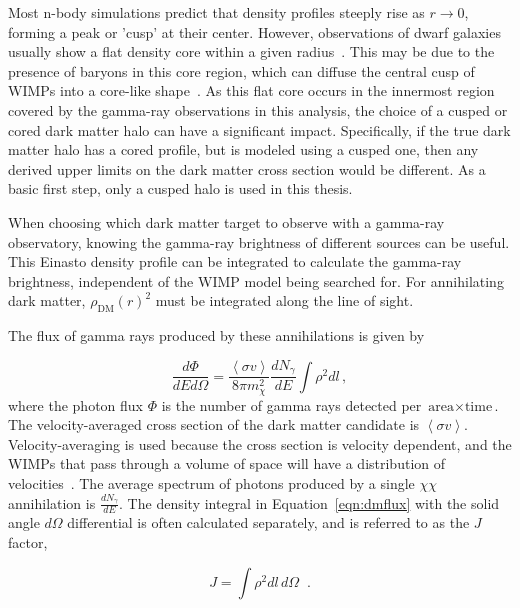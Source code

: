     
    Most n-body simulations predict that density profiles steeply rise as $r \rightarrow 0$, forming a peak or 'cusp' at their center.
    However, observations of dwarf galaxies usually show a flat density core within a given radius~\cite{flores1994observational,CoreVsCusp}.
    This may be due to the presence of baryons in this core region, which can diffuse the central cusp of WIMPs into a core-like shape~\cite{corecusp_baryondiffuse1,corecusp_baryondiffuse2}.
    As this flat core occurs in the innermost region covered by the gamma-ray observations in this analysis, the choice of a cusped or cored dark matter halo can have a significant impact.
    Specifically, if the true dark matter halo has a cored profile, but is modeled using a cusped one, then any derived upper limits on the dark matter cross section would be different.
    As a basic first step, only a cusped halo is used in this thesis.
    
    When choosing which dark matter target to observe with a gamma-ray observatory, knowing the gamma-ray brightness of different sources can be useful.
    This Einasto density profile can be integrated to calculate the gamma-ray brightness, independent of the WIMP model being searched for.
    For annihilating dark matter, $\rho_{\textrm{DM}}\left(r\right)^2$ must be integrated along the line of sight.
    
    The flux of gamma rays produced by these annihilations is given by
    
    \begin{equation}\label{eqn:dmflux}
      \frac{ d\Phi }{ dE d \Omega } = \frac{ \left \langle \sigma v \right \rangle }{8 \pi m_\chi^2} \frac{dN_{\gamma}}{dE} \int \rho^2 dl \, ,
    \end{equation}
    where the photon flux $\Phi$ is the number of gamma rays detected per $\textrm{area}\times\textrm{time}$.
    The velocity-averaged cross section of the dark matter candidate is $\left \langle \sigma v \right \rangle$.
    Velocity-averaging is used because the cross section is velocity dependent, and the WIMPs that pass through a volume of space will have a distribution of velocities~\cite{wimp_veldist}.
    The average spectrum of photons produced by a single $\chi\chi$ annihilation is $\frac{dN_{\gamma}}{dE}$.
    The density integral in Equation~\ref{eqn:dmflux} with the solid angle $d\Omega$ differential is often calculated separately, and is referred to as the $J$ factor,

    \begin{equation}\label{eqn:jfactor}
      J = \int \rho^2 dl\,d\Omega \;\; .
    \end{equation}

